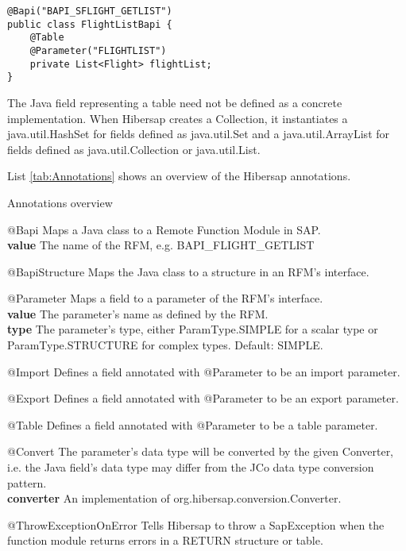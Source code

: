 \begin{lstlisting}
@Bapi("BAPI_SFLIGHT_GETLIST") 
public class FlightListBapi {
    @Table 
    @Parameter("FLIGHTLIST") 
    private List<Flight> flightList;
}
\end{lstlisting}

The Java field representing a table need not be defined as a concrete implementation. When Hibersap creates a Collection, it instantiates a java.util.HashSet for fields defined as java.util.Set and a java.util.ArrayList for fields defined as java.util.Collection or java.util.List.

List \ref{tab:Annotations} shows an overview of the Hibersap annotations.

\newpage

\begin{descriptionBlock}{Annotations overview}
\label{tab:Annotations}
\item[@Bapi] 
    Maps a Java class to a Remote Function Module in SAP.\\
    \textbf{value} The name of the RFM, e.g. BAPI\_FLIGHT\_GETLIST
\item[@BapiStructure]
    Maps the Java class to a structure in an RFM's interface.
\item[@Parameter]
    Maps a field to a parameter of the RFM's interface.\\
    \textbf{value} The parameter's name as defined by the RFM.\\ 
    \textbf{type} The parameter's type, either ParamType.SIMPLE for a scalar type or\\
                  ParamType.STRUCTURE for complex types. Default: SIMPLE. 
\item[@Import]
    Defines a field annotated with @Parameter to be an import parameter. 
\item[@Export]
    Defines a field annotated with @Parameter to be an export parameter. 
\item[@Table]
    Defines a field annotated with @Parameter to be a table parameter. 
\item[@Convert]
    The parameter's data type will be converted by the given Converter, i.e. the Java field's data type may differ from 
    the JCo data type conversion pattern.\\
    \textbf{converter} An implementation of org.hibersap.conversion.Converter. 
\item[@ThrowExceptionOnError]
	Tells Hibersap to throw a SapException when the function module returns errors in a RETURN structure or table. \\

\end{descriptionBlock}
